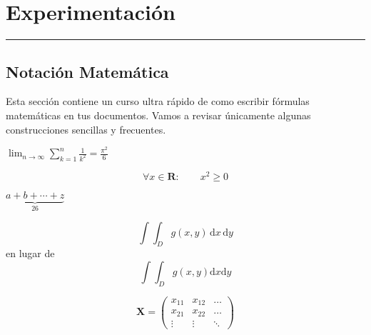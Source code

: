 \chapter{Experimentación}
\hrule \bigskip \vspace*{1cm}

\section{Notación Matemática}

Esta sección contiene un curso ultra rápido de como escribir
fórmulas matemáticas en tus documentos. Vamos a revisar únicamente
algunas construcciones sencillas y frecuentes.

$\lim_{n \to \infty} \sum_{k=1}^n \frac{1}{k^2} = \frac{\pi^2}{6}$

\begin{equation}
\forall x \in \mathbf{R}: \qquad x^{2} \geq 0
\end{equation}

$\underbrace{ a+b+\cdots+z }_{26}$

\newcommand{\rd}{\mathrm{d}}
\begin{displaymath}
\int\!\!\!\int_{D} g(x,y) \, \rd x\, \rd y
\end{displaymath}
en lugar de
\begin{displaymath}
\int\int_{D} g(x,y)\rd x \rd y
\end{displaymath}


\begin{displaymath}
\mathbf{X} = \left( \begin{array}{ccc}
x_{11} & x_{12} & \ldots \\
x_{21} & x_{22} & \ldots \\
\vdots & \vdots & \ddots
\end{array} \right)
\end{displaymath}
